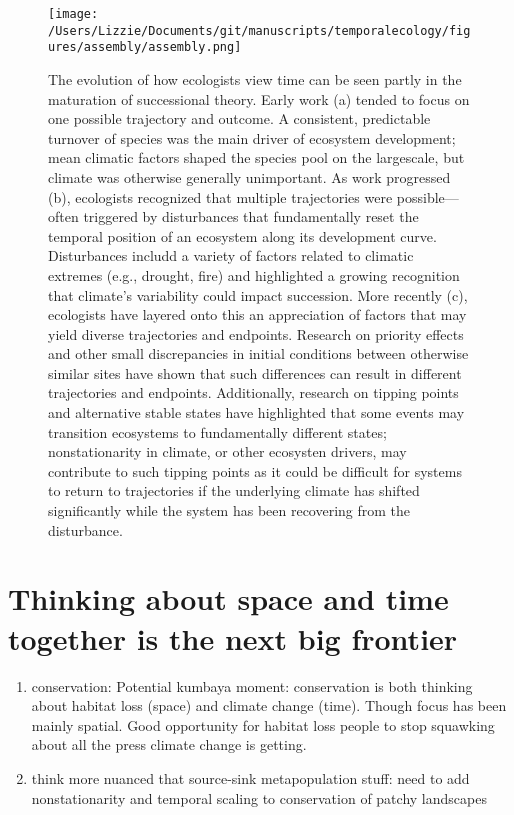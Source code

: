 \documentclass[11pt,a4paper,oneside]{article}
\begin{document}
\begin{figure}[h!]
\centering
\noindent \texttt{[image: /Users/Lizzie/Documents/git/manuscripts/temporalecology/figures/assembly/assembly.png]}
\caption{The evolution of how ecologists view time can be seen partly in the maturation of successional theory. Early work (a) tended to focus on one possible trajectory and outcome. A consistent, predictable turnover of species was the main driver of ecosystem development; mean climatic factors shaped the species pool on the largescale, but climate was otherwise generally unimportant. As work progressed (b), ecologists recognized that multiple trajectories were possible---often triggered by disturbances that fundamentally reset the temporal position of an ecosystem along its development curve. Disturbances includd a variety of factors related to climatic extremes (e.g., drought, fire) and highlighted a growing recognition that climate's variability could impact succession. More recently (c), ecologists have layered onto this an appreciation of factors that may yield diverse trajectories and endpoints. Research on priority effects and other small discrepancies in initial conditions between otherwise similar sites have shown that such differences can result in different trajectories and endpoints. Additionally, research on tipping points and alternative stable states have highlighted that some events may transition ecosystems to fundamentally different states; nonstationarity in climate, or other ecosysten drivers, may contribute to such tipping points as it could be difficult for systems to return to trajectories if the underlying climate has shifted significantly while the system has been recovering from the disturbance.}
\end{figure}


\section{Thinking about space and time together is the next big frontier}
\begin{enumerate}
\item conservation: Potential kumbaya moment: conservation is both thinking about habitat loss (space) and climate change (time). Though focus has been mainly spatial. Good opportunity for habitat loss people to stop squawking about all the press climate change is getting.
\item think more nuanced that source-sink metapopulation stuff: need to add nonstationarity and temporal scaling to conservation of patchy landscapes 
\end{enumerate}
\end{document}
